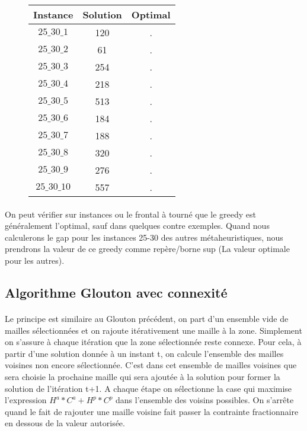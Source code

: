 \documentclass[a4paper, 11pt]{article} %
\begin{document}
\begin{center}
\begin{figure}[H]
      \begin{tabular}{|c|c|c|}
      \hline 
        Instance & Solution & Optimal  \\ \hline
        $25\_30\_1$ & 120  & .  \\ \hline
        $25\_30\_2$ & 61  & .  \\ \hline
        $25\_30\_3$ & 254  & .  \\ \hline
        $25\_30\_4$ & 218  & .  \\ \hline
        $25\_30\_5$ & 513  & .  \\ \hline
        $25\_30\_6$ & 184  & .  \\ \hline
        $25\_30\_7$ & 188  & .  \\ \hline
        $25\_30\_8$ & 320  & .  \\ \hline
        $25\_30\_9$ & 276  & .  \\ \hline
        $25\_30\_10$ & 557 & .  \\ \hline
      \end{tabular}
\end{figure}
\end{center}

\paragraph*{}
On peut vérifier sur instances ou le frontal à tourné que le greedy est généralement l'optimal, sauf dans quelques contre exemples. Quand nous calculerons le gap pour les instances 25-30 des autres métaheuristiques, nous prendrons la valeur de ce greedy comme repère/borne sup (La valeur optimale pour les autres).

\subsection{Algorithme Glouton avec connexité}

\paragraph*{}
Le principe est similaire au Glouton précédent, on part d'un ensemble vide de mailles sélectionnées et on rajoute itérativement une maille à la zone. Simplement on s'assure à chaque itération que la zone sélectionnée reste connexe. Pour cela, à partir d'une solution donnée à un instant t, on calcule l'ensemble des mailles voisines non encore sélectionnée. C'est dans cet ensemble de mailles voisines que sera choisie la prochaine maille qui sera ajoutée à la solution pour former la solution de l'itération t+1. A chaque étape on sélectionne la case qui maximise l'expression $H^a*C^a+H^p*C^p$ dans l'ensemble des voisins possibles. On s'arrête quand le fait de rajouter une maille voisine fait passer la contrainte fractionnaire en dessous de la valeur autorisée.
\end{document}
